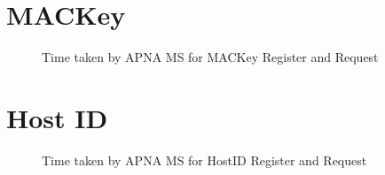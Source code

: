 \section{MACKey}
\begin{figure}[th!!]
\centering
\noindent
{}
\decoRule
\caption[MACKey Operations]{Time taken by APNA MS for MACKey Register and Request}
\label{fig:perf_ephid}
\end{figure}

\section{Host ID}
\begin{figure}[th!!]
\centering
\noindent
{}
\decoRule
\caption[HostID Operations]{Time taken by APNA MS for HostID Register and Request}
\label{fig:perf_ephid}
\end{figure}


